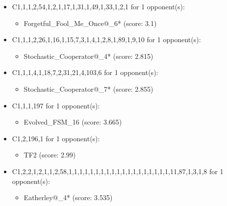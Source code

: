 \begin{appendices}
\begin{itemize}
    \item C1,1,1,2,54,1,2,1,17,1,31,1,49,1,33,1,2,1 for 1 opponent(s):
    \begin{multicols}{3}
         \begin{itemize}
            \item Forgetful\_Fool\_Me\_Once@\_6* (score: 3.1)
        \end{itemize}
     \end{multicols}
     
    \item C1,1,1,2,26,1,16,1,15,7,3,1,4,1,2,8,1,89,1,9,10 for 1 opponent(s):
    \begin{multicols}{3}
         \begin{itemize}
            \item Stochastic\_Cooperator@\_4* (score: 2.815)
        \end{itemize}
     \end{multicols}
     
    \item C1,1,1,4,1,18,7,2,31,21,4,103,6 for 1 opponent(s):
    \begin{multicols}{3}
         \begin{itemize}
            \item Stochastic\_Cooperator@\_7* (score: 2.855)
        \end{itemize}
     \end{multicols}
     
    \item C1,1,1,197 for 1 opponent(s):
    \begin{multicols}{3}
         \begin{itemize}
            \item Evolved\_FSM\_16 (score: 3.665)
        \end{itemize}
     \end{multicols}
     
    \item C1,2,196,1 for 1 opponent(s):
    \begin{multicols}{3}
         \begin{itemize}
            \item TF2 (score: 2.99)
        \end{itemize}
     \end{multicols}
     
    \item C1,2,2,1,2,1,1,2,58,1,1,1,1,1,1,1,1,1,1,1,1,1,1,1,1,1,1,1,11,87,1,3,1,8 for 1 opponent(s):
    \begin{multicols}{3}
         \begin{itemize}
            \item Eatherley@\_4* (score: 3.535)
        \end{itemize}
     \end{multicols}
     

\end{itemize}
\end{appendices}
